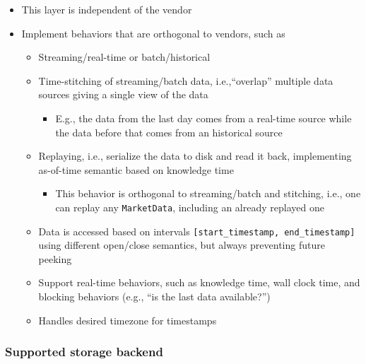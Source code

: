 \documentclass[11pt, reqno]{amsart}
\theoremstyle{definition}
\theoremstyle{remark}
\begin{document}
\begin{itemize}
  \item This layer is independent of the vendor
  \item Implement behaviors that are orthogonal to vendors, such as

        \begin{itemize}
          \item Streaming/real-time or batch/historical
          \item Time-stitching of streaming/batch data, i.e.,``overlap'' multiple
                data sources giving a single view of the data

                \begin{itemize}
                  \item E.g., the data from the last day comes from a real-time source
                        while the data before that comes from an historical source
                \end{itemize}
          \item Replaying, i.e., serialize the data to disk and read it back,
                implementing as-of-time semantic based on knowledge time

                \begin{itemize}
                  \item This behavior is orthogonal to streaming/batch and stitching,
                        i.e., one can replay any \texttt{MarketData}, including an already
                        replayed one
                \end{itemize}
          \item Data is accessed based on intervals \verb|[start_timestamp, end_timestamp]|
                using different open/close semantics, but always preventing future peeking
          \item Support real-time behaviors, such as knowledge time, wall clock time,
                and blocking behaviors (e.g., ``is the last data available?'')
          \item Handles desired timezone for timestamps
        \end{itemize}
\end{itemize}


\subsubsection{Supported storage backend}
\end{document}
